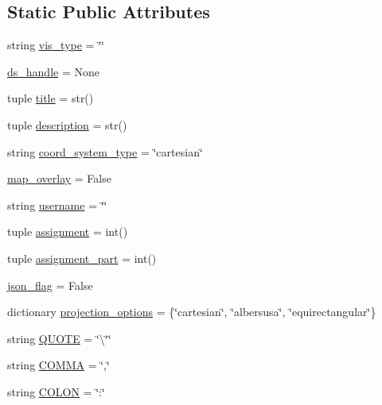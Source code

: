 \subsection*{Static Public Attributes}
\begin{DoxyCompactItemize}
\item 
string \hyperlink{classbridges_1_1bridges_1_1_bridges_a7eceb4799ff2849276f226d3f229db62}{vis\+\_\+type} = \char`\"{}\char`\"{}
\item 
\hyperlink{classbridges_1_1bridges_1_1_bridges_a7a6f25612be64d4f3e203d7d37cb4da4}{ds\+\_\+handle} = None
\item 
tuple \hyperlink{classbridges_1_1bridges_1_1_bridges_a65faebe331a9b97a3da6772b39f822dc}{title} = str()
\item 
tuple \hyperlink{classbridges_1_1bridges_1_1_bridges_aa969453a479b7fee4a8b82345e3985ba}{description} = str()
\item 
string \hyperlink{classbridges_1_1bridges_1_1_bridges_a93e3e17b5c5030d84360d1545cc673c2}{coord\+\_\+system\+\_\+type} = \char`\"{}cartesian\char`\"{}
\item 
\hyperlink{classbridges_1_1bridges_1_1_bridges_aa67713c0f2a1c05b5732eb9b046ec79b}{map\+\_\+overlay} = False
\item 
string \hyperlink{classbridges_1_1bridges_1_1_bridges_a492041cbcac828d5a26fcad8515fb221}{username} = \char`\"{}\char`\"{}
\item 
tuple \hyperlink{classbridges_1_1bridges_1_1_bridges_a1a89d732324054f1f349547373c9605c}{assignment} = int()
\item 
tuple \hyperlink{classbridges_1_1bridges_1_1_bridges_a7b944613be7669203fd1312bfa1bca05}{assignment\+\_\+part} = int()
\item 
\hyperlink{classbridges_1_1bridges_1_1_bridges_ae766e8b9faa590137c3d9e65f04b7d93}{json\+\_\+flag} = False
\item 
dictionary \hyperlink{classbridges_1_1bridges_1_1_bridges_a2dd533aa990f2a4f32932897c48b6a0b}{projection\+\_\+options} = \{\char`\"{}cartesian\char`\"{}, \char`\"{}albersusa\char`\"{}, \char`\"{}equirectangular\char`\"{}\}
\item 
string \hyperlink{classbridges_1_1bridges_1_1_bridges_ab445c9b4d314ff1ffb40ae0d7d451f8f}{Q\+U\+O\+T\+E} = \char`\"{}\textbackslash{}\char`\"{}\char`\"{}
\item 
string \hyperlink{classbridges_1_1bridges_1_1_bridges_a20a728277c6c1efa215e98aeeda7a32a}{C\+O\+M\+M\+A} = \char`\"{},\char`\"{}
\item 
string \hyperlink{classbridges_1_1bridges_1_1_bridges_a96daf5f4d3db20e599d6480c0e6d9227}{C\+O\+L\+O\+N} = \char`\"{}\+:\char`\"{}

\end{DoxyCompactItemize}
